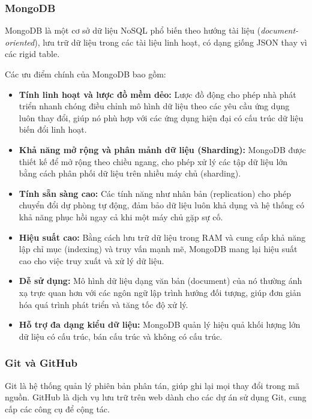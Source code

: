 \subsubsection{MongoDB}

MongoDB là một cơ sở dữ liệu NoSQL phổ biến theo hướng tài liệu (\textit{document-oriented}), 
lưu trữ dữ liệu trong các tài liệu linh hoạt, có dạng giống JSON thay vì các rigid table. 

Các ưu điểm chính của MongoDB bao gồm:  

\begin{itemize}
    \item \textbf{Tính linh hoạt và lược đồ mềm dẻo:}  
    Lược đồ động cho phép nhà phát triển nhanh chóng điều chỉnh mô hình dữ liệu theo các yêu cầu ứng dụng luôn thay đổi, giúp nó phù hợp với các ứng dụng hiện đại có cấu trúc dữ liệu biến đổi linh hoạt.

    \item \textbf{Khả năng mở rộng và phân mảnh dữ liệu (Sharding):}  
    MongoDB được thiết kế để mở rộng theo chiều ngang, cho phép xử lý các tập dữ liệu lớn bằng cách phân phối dữ liệu trên nhiều máy chủ (sharding).

    \item \textbf{Tính sẵn sàng cao:}  
    Các tính năng như nhân bản (replication) cho phép chuyển đổi dự phòng tự động, đảm bảo dữ liệu luôn khả dụng và hệ thống có khả năng phục hồi ngay cả khi một máy chủ gặp sự cố.

    \item \textbf{Hiệu suất cao:}  
    Bằng cách lưu trữ dữ liệu trong RAM và cung cấp khả năng lập chỉ mục (indexing) và truy vấn mạnh mẽ, MongoDB mang lại hiệu suất cao cho việc truy xuất và xử lý dữ liệu.

    \item \textbf{Dễ sử dụng:}  
    Mô hình dữ liệu dạng văn bản (document) của nó thường ánh xạ trực quan hơn với các ngôn ngữ lập trình hướng đối tượng, giúp đơn giản hóa quá trình phát triển và tăng tốc độ xử lý.

    \item \textbf{Hỗ trợ đa dạng kiểu dữ liệu:}  
    MongoDB quản lý hiệu quả khối lượng lớn dữ liệu có cấu trúc, bán cấu trúc và không có cấu trúc.
\end{itemize}
\subsubsection{Git và GitHub}
Git là hệ thống quản lý phiên bản phân tán, giúp ghi lại mọi thay đổi trong mã nguồn. GitHub là dịch vụ lưu trữ trên web dành cho các dự án sử dụng Git, cung cấp các công cụ để cộng tác.

